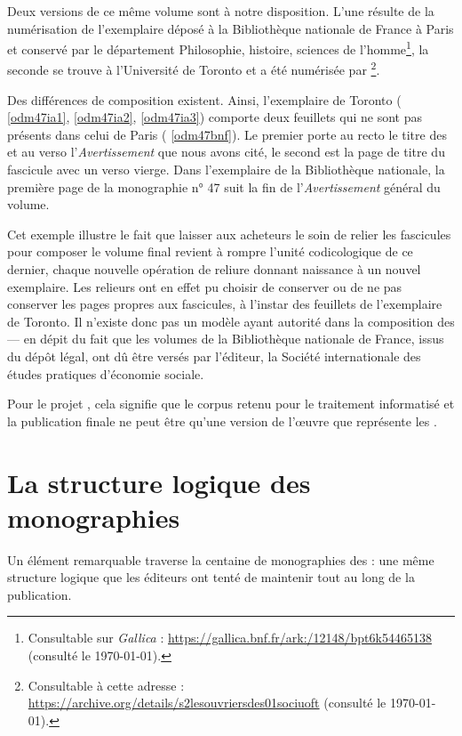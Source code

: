 Deux versions de ce même volume sont à notre disposition. L'une résulte de la numérisation de l'exemplaire déposé à la Bibliothèque nationale de France à Paris et conservé par le département Philosophie, histoire, sciences de l'homme\footnote{Consultable sur \textit{Gallica} : \url{https://gallica.bnf.fr/ark:/12148/bpt6k54465138} (consulté le \today).}, la seconde se trouve à l'Université de Toronto et a été numérisée par \ia\footnote{Consultable à cette adresse : \url{https://archive.org/details/s2lesouvriersdes01sociuoft} (consulté le \today).}.

Des différences de composition existent. Ainsi, l'exemplaire de Toronto (\fig{} \ref{odm47ia1}, \ref{odm47ia2}, \ref{odm47ia3}) comporte deux feuillets qui ne sont pas présents dans celui de Paris (\fig{} \ref{odm47bnf}). Le premier porte au recto le titre des \odm{} et au verso l'\textit{Avertissement} que nous avons cité, le second est la page de titre du fascicule avec un verso vierge. Dans l'exemplaire de la Bibliothèque nationale, la première page de la monographie n° 47 suit la fin de l'\textit{Avertissement} général du volume.

Cet exemple illustre le fait que laisser aux acheteurs le soin de relier les fascicules pour composer le volume final revient à rompre l'unité codicologique de ce dernier, chaque nouvelle opération de reliure donnant naissance à un nouvel exemplaire. Les relieurs ont en effet pu choisir de conserver ou de ne pas conserver les pages propres aux fascicules, à l'instar des feuillets de l'exemplaire de Toronto. Il n'existe donc pas un modèle ayant autorité dans la composition des \odm{} --- en dépit du fait que les volumes de la Bibliothèque nationale de France, issus du dépôt légal, ont dû être versés par l'éditeur, \cad{} la Société internationale des études pratiques d'économie sociale.

Pour le projet \timeus{}, cela signifie que le corpus retenu pour le traitement informatisé et la publication finale ne peut être qu'une version de l'\oe{}uvre que représente les \odm.

\section{La structure logique des monographies}

Un élément remarquable traverse la centaine de monographies des \odm{} : une même structure logique que les éditeurs ont tenté de maintenir tout au long de la publication.

